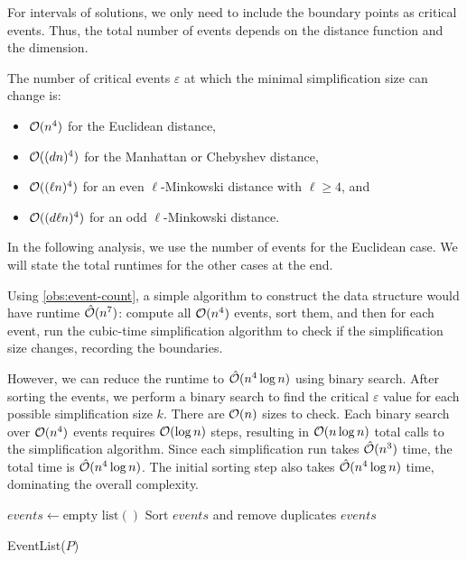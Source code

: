 For intervals of solutions, we only need to include the boundary points as critical events. Thus, the total number of events depends on the distance function and the dimension.

\begin{observation}\label{obs:event-count}
	The number of critical events \(\varepsilon\) at which the minimal simplification size can change is:
	\begin{itemize}
		\item \(\mathcal{O}(n^4)\) for the Euclidean distance,
		\item \(\mathcal{O}((d n)^4)\) for the Manhattan or Chebyshev distance,
		\item \(\mathcal{O}((\ell n)^4)\) for an even \(\ell\)-Minkowski distance with \(\ell \geq 4\), and
		\item \(\mathcal{O}((d \ell n)^4)\) for an odd \(\ell\)-Minkowski distance.
	\end{itemize}
\end{observation}

In the following analysis, we use the number of events for the Euclidean case. We will state the total runtimes for the other cases at the end.

Using \cref{obs:event-count}, a simple algorithm to construct the data structure would have runtime \(\hat{\mathcal{O}}(n^7)\): compute all \(\mathcal{O}(n^4)\) events, sort them, and then for each event, run the cubic-time simplification algorithm to check if the simplification size changes, recording the boundaries.

However, we can reduce the runtime to \(\hat{\mathcal{O}}(n^4 \log n)\) using binary search. After sorting the events, we perform a binary search to find the critical \(\varepsilon\) value for each possible simplification size \(k\). There are \(\mathcal{O}(n)\) sizes to check. Each binary search over \(\mathcal{O}(n^4)\) events requires \(\mathcal{O}(\log n)\) steps, resulting in \(\mathcal{O}(n \log n)\) total calls to the simplification algorithm. Since each simplification run takes \(\hat{\mathcal{O}}(n^3)\) time, the total time is \(\hat{\mathcal{O}}(n^4 \log n)\). The initial sorting step also takes \(\hat{\mathcal{O}}(n^4 \log n)\) time, dominating the overall complexity.

\begin{algorithm}[ht]
  \DontPrintSemicolon
  \BlankLine
	\(events \gets \text{empty list}()\) 
	Sort \(events\) and remove duplicates\;
	\Return \(events\)
  \caption{EventList(\(P\))}
  \label{algo:event-list}
\end{algorithm}

